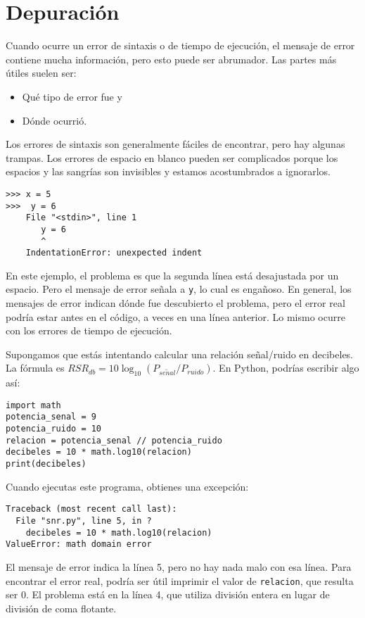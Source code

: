 \documentclass[10pt]{book}
\begin{document}
\section{Depuración}
\label{whitespace}

Cuando ocurre un error de sintaxis o de tiempo de ejecución, el mensaje de error contiene
mucha información, pero esto puede ser abrumador.  Las partes
más útiles suelen ser:

\begin{itemize}

\item Qué tipo de error fue y

\item Dónde ocurrió.

\end{itemize}

Los errores de sintaxis son generalmente fáciles de encontrar, pero hay algunas
trampas.  Los errores de espacio en blanco pueden ser complicados porque los espacios y
las sangrías son invisibles y estamos acostumbrados a ignorarlos.

\begin{verbatim}
>>> x = 5
>>>  y = 6
    File "<stdin>", line 1
       y = 6
       ^
    IndentationError: unexpected indent
\end{verbatim}
%
En este ejemplo, el problema es que la segunda línea está desajustada por
un espacio.  Pero el mensaje de error señala a {\tt y}, lo cual es
engañoso.  En general, los mensajes de error indican dónde fue descubierto
el problema, pero el error real podría estar antes en el código,
a veces en una línea anterior. Lo mismo ocurre con los errores de tiempo de ejecución. 

Supongamos que estás intentando
calcular una relación señal/ruido en decibeles.  La fórmula
es $RSR_{db} = 10 \log_{10} (P_{se\tilde{n}al} / P_{ruido})$.  En Python,
podrías escribir algo así:

\begin{verbatim}
import math
potencia_senal = 9
potencia_ruido = 10
relacion = potencia_senal // potencia_ruido
decibeles = 10 * math.log10(relacion)
print(decibeles)
\end{verbatim}
%
Cuando ejecutas este programa, obtienes una excepción:
%

\begin{verbatim}
Traceback (most recent call last):
  File "snr.py", line 5, in ?
    decibeles = 10 * math.log10(relacion)
ValueError: math domain error
\end{verbatim}
%
El mensaje de error indica la línea 5, pero no hay nada
malo con esa línea.  Para encontrar el error real, podría ser
útil imprimir el valor de {\tt relacion}, que resulta
ser 0.  El problema está en la línea 4, que utiliza división entera
en lugar de división de coma flotante.
\end{document}
